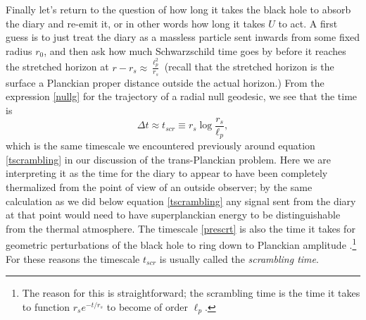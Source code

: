 \documentclass[12pt]{article}
\newcommand{\be}{\begin{equation}}
\newcommand{\ee}{\end{equation}}
\begin{document}
Finally let's return to the question of how long it takes the black hole to absorb the diary and re-emit it, or in other words how long it takes $U$ to act.  A first guess is to just treat the diary as a massless particle sent inwards from some fixed radius $r_0$, and then ask how much Schwarzschild time goes by before it reaches the stretched horizon at $r-r_s\approx \frac{\ell_p^2}{r_s}$ (recall that the stretched horizon is the surface a Planckian proper distance outside the actual horizon.)  From the expression \eqref{nullg} for the trajectory of a radial null geodesic, we see that the time is
\be\label{prescrt}
\Delta t \approx t_{\mathit{scr}}\equiv r_s\log \frac{r_s}{\ell_p},
\ee
which is the same timescale we encountered previously around equation \eqref{tscrambling} in our discussion of the trans-Planckian problem.  Here we are interpreting it as the time for the diary to appear to have been completely thermalized from the point of view of an outside observer; by the same calculation as we did below equation \eqref{tscrambling} any signal sent from the diary at that point would need to have superplanckian energy to be distinguishable from the thermal atmosphere.  The timescale \eqref{prescrt} is also the time it takes for geometric perturbations of the black hole to ring down to Planckian amplitude \cite{Price:1986yy}.\footnote{The reason for this is straightforward; the scrambling time is the time it takes to function $r_s e^{-t/r_s}$ to become of order $\ell_p$.}  For these reasons the timescale $t_{\mathit{scr}}$ is usually called the \textit{scrambling time}.  
\end{document}
